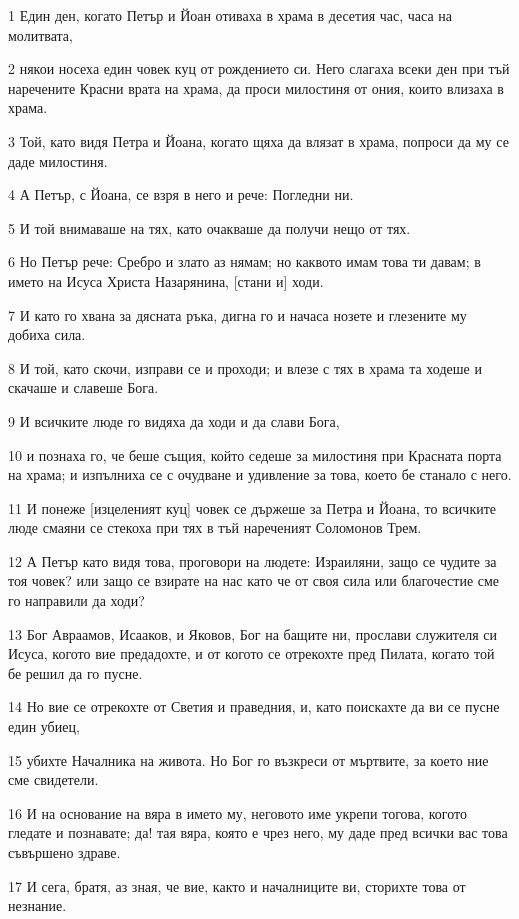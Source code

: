 \par 1 Един ден, когато Петър и Йоан отиваха в храма в десетия час, часа на молитвата,
\par 2 някои носеха един човек куц от рождението си. Него слагаха всеки ден при тъй наречените Красни врата на храма, да проси милостиня от ония, които влизаха в храма.
\par 3 Той, като видя Петра и Йоана, когато щяха да влязат в храма, попроси да му се даде милостиня.
\par 4 А Петър, с Йоана, се взря в него и рече: Погледни ни.
\par 5 И той внимаваше на тях, като очакваше да получи нещо от тях.
\par 6 Но Петър рече: Сребро и злато аз нямам; но каквото имам това ти давам; в името на Исуса Христа Назарянина, [стани и] ходи.
\par 7 И като го хвана за дясната ръка, дигна го и начаса нозете и глезените му добиха сила.
\par 8 И той, като скочи, изправи се и проходи; и влезе с тях в храма та ходеше и скачаше и славеше Бога.
\par 9 И всичките люде го видяха да ходи и да слави Бога,
\par 10 и познаха го, че беше същия, който седеше за милостиня при Красната порта на храма; и изпълниха се с очудване и удивление за това, което бе станало с него.
\par 11 И понеже [изцеленият куц] човек се държеше за Петра и Йоана, то всичките люде смаяни се стекоха при тях в тъй нареченият Соломонов Трем.
\par 12 А Петър като видя това, проговори на людете: Израиляни, защо се чудите за тоя човек? или защо се взирате на нас като че от своя сила или благочестие сме го направили да ходи?
\par 13 Бог Авраамов, Исааков, и Яковов, Бог на бащите ни, прослави служителя си Исуса, когото вие предадохте, и от когото се отрекохте пред Пилата, когато той бе решил да го пусне.
\par 14 Но вие се отрекохте от Светия и праведния, и, като поискахте да ви се пусне един убиец,
\par 15 убихте Началника на живота. Но Бог го възкреси от мъртвите, за което ние сме свидетели.
\par 16 И на основание на вяра в името му, неговото име укрепи тогова, когото гледате и познавате; да! тая вяра, която е чрез него, му даде пред всички вас това съвършено здраве.
\par 17 И сега, братя, аз зная, че вие, както и началниците ви, сторихте това от незнание.
